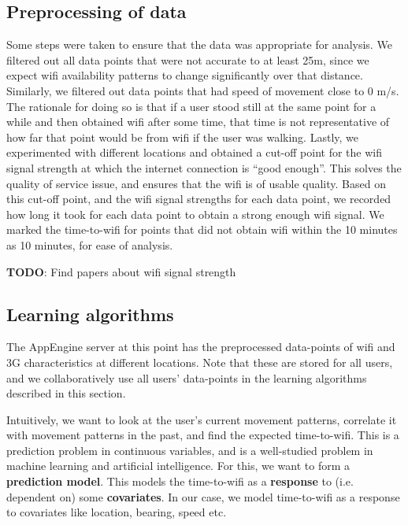 \documentclass[12pt, fleqn]{article}
\begin{document}
\subsection{Preprocessing of data}

Some steps were taken to ensure that the data was appropriate for analysis. We filtered
out all data points that were not accurate to at least 25m, since we expect wifi availability 
patterns to change significantly over that distance. Similarly, we filtered out data points that 
had speed of movement close to 0 m/s. The rationale for doing so is that if a user stood 
still at the same point for a while and then obtained wifi after some time, that time is not 
representative of how far that point would be from wifi if the user was walking. Lastly, we 
experimented with different locations and obtained a cut-off point for the wifi signal 
strength at which the internet connection is “good enough”. This solves the 
quality of service issue, and ensures that the wifi is of usable quality. Based on this cut-off point, 
and the wifi signal strengths for each data point, we recorded how long it took for each 
data point to obtain a strong enough wifi signal. We marked the time-to-wifi for points 
that did not obtain wifi within the 10 minutes as 10 minutes, for ease of analysis.

\textbf{TODO}: Find papers about wifi signal strength

\subsection{Learning algorithms} 
\label{time-to-wifi-learning-algorithms}

The AppEngine server at this point has the preprocessed data-points of wifi and 3G 
characteristics at different locations. Note that these are stored 
for all users, and we collaboratively use all users' data-points in the 
learning algorithms described in this section. 

Intuitively, we want to look at the user's current movement patterns, 
correlate it with movement patterns in the past, and find the expected 
time-to-wifi. This is a prediction problem in continuous variables, and is a 
well-studied problem in machine learning and artificial intelligence. 
For this, we want to form a \textbf{prediction model}. This models 
the time-to-wifi as a \textbf{response} to (i.e. dependent on) some  
\textbf{covariates}. In our case, we model time-to-wifi as a response to 
covariates like location, bearing, speed etc. 
\end{document}
